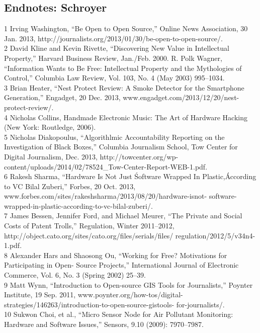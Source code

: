 \begin{itemize}
\section{Endnotes: Schroyer}
1 Irving Washington, ``Be Open to Open Source,'' Online News Association, 30 Jan. 2013,
http://journalists.org/2013/01/30/be-open-to-open-source/.\\
2 David Kline and Kevin Rivette, ``Discovering New Value in Intellectual Property,''
Harvard Business Review, Jan./Feb. 2000. R. Polk Wagner, ``Information Wants to Be Free:
Intellectual Property and the Mythologies of Control,'' Columbia Law Review, Vol. 103,
No. 4 (May 2003) 995–1034.\\
3 Brian Heater, ``Nest Protect Review: A Smoke Detector for the Smartphone Generation,''
Engadget, 20 Dec. 2013, www.engadget.com/2013/12/20/nest-protect-review/.\\
4 Nicholas Collins, Handmade Electronic Music: The Art of Hardware Hacking (New York:
Routledge, 2006).\\
5 Nicholas Diakopoulus, ``Algorithlmic Accountability Reporting on the Investigation of Black
Boxes,'' Columbia Journalism School, Tow Center for Digital Journalism, Dec. 2013,
http://towcenter.org/wp-content/uploads/2014/02/78524_Tow-Center-Report-WEB-1.pdf.\\
6 Rakesh Sharma, ``Hardware Is Not Just \'Software Wrapped In Plastic,\' According to VC Bilal
Zuberi,'' Forbes, 20 Oct. 2013, www.forbes.com/sites/rakeshsharma/2013/08/20/hardware-isnot-
software-wrapped-in-plastic-according-to-vc-bilal-zuberi/.\\
7 James Bessen, Jennifer Ford, and Michael Meurer, ``The Private and Social Costs of Patent
Trolls,'' Regulation, Winter 2011–2012, http://object.cato.org/sites/cato.org/files/serials/files/
regulation/2012/5/v34n4-1.pdf.\\
8 Alexander Hars and Shaosong Ou, ``Working for Free? Motivations for Participating in Open-
Source Projects,'' International Journal of Electronic Commerce, Vol. 6, No. 3 (Spring 2002) 25–39.\\
9 Matt Wynn, ``Introduction to Open-source GIS Tools for Journalists,'' Poynter Institute, 19 Sep.
2011, www.poynter.org/how-tos/digital-strategies/146263/introduction-to-open-source-gistools-
for-journalists/.\\
10 Sukwon Choi, et al., ``Micro Sensor Node for Air Pollutant Monitoring: Hardware and Software
Issues,'' Sensors, 9.10 (2009): 7970–7987.\\

\end{itemize}

